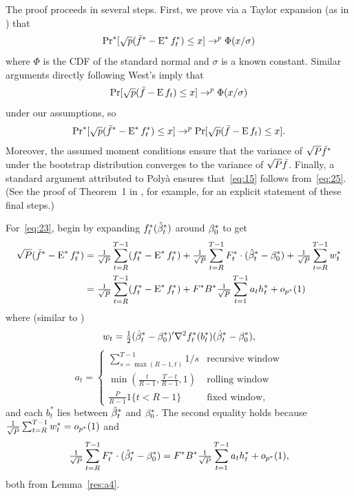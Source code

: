 \documentclass[12pt,fleqn]{article}
\begin{document}
The proof proceeds in several steps. First, we prove via a Taylor
expansion (as in \citealp{Wes:96}) that
\begin{equation}\label{eq:23}
  \operatorname{Pr}^*[\sqrt{p} (\bar f^* - \operatorname{E}^* f_t^*) \leq x] \to^p \Phi(x / \sigma)
\end{equation}
where $\Phi$ is the CDF of the standard normal and $\sigma$ is a known
constant. Similar arguments directly following West's imply that
\begin{equation}\label{eq:24}
  \operatorname{Pr}[\sqrt{p} (\bar f - \operatorname{E} f_t) \leq x] \to^p \Phi(x / \sigma)
\end{equation}
under our assumptions, so
\begin{equation}\label{eq:25}
  \operatorname{Pr}^*[\sqrt{p} (\bar f^* - \operatorname{E}^* f_t^*) \leq x] \to^p
  \operatorname{Pr}[\sqrt{p} (\bar f - \operatorname{E} f_t) \leq x].
\end{equation}
Moreover, the assumed moment conditions ensure that the variance of
$\sqrt{P} \bar f^*$ under the bootstrap distribution converges to the
variance of $\sqrt{P} \bar f$. Finally, a standard argument attributed
to Poly{\`a} ensures that~\eqref{eq:15} follows
from~\eqref{eq:25}. (See the proof of Theorem~1 in \citealp{Cal:14},
for example, for an explicit statement of these final steps.)

For~\eqref{eq:23}, begin by expanding $f_t^{*}(\hat \beta_t^*)$ around
$\beta_0^*$ to get
  \begin{align*}
    \sqrt{P} (\bar f^* - \operatorname{E}^* f_t^*)
    &= \tfrac{1}{\sqrt{P}} \sum_{t=R}^{T-1} (f_t^{*} - \operatorname{E}^* f_t^*)
     + \tfrac{1}{\sqrt{P}} \sum_{t=R}^{T-1} F_t^* \cdot (\hat \beta_t^* - \beta_0^*)
     + \tfrac{1}{\sqrt{P}} \sum_{t=R}^{T-1} w_t^* \\
    &= \tfrac{1}{\sqrt{P}} \sum_{t=R}^{T-1} (f_t^{*} - \operatorname{E}^* f_t^*)
     + F^* B^* \tfrac{1}{\sqrt{P}} \sum_{t=1}^{T-1} a_t h_t^* + o_{p^*}(1)
  \end{align*}
  where (similar to \citealp{Wes:96})
  \begin{equation*}
    w_{t} = \tfrac12 (\hat \beta_t^* - \beta_0^*)' \nabla^2 f_{t}^*(b_{t}^*) (\hat \beta_t^* - \beta_0^*),
  \end{equation*}
  \begin{equation}\label{eq:1}
    a_t =
    \begin{cases}
      \sum_{s=\max(R-1, t)}^{T-1} 1/s & \text{recursive window} \\
      \min(\tfrac{t}{R-1}, \tfrac{T - t}{R-1}, 1) & \text{rolling window} \\
      \tfrac{P}{R-1} 1\{t < R-1\} &  \text{fixed window},
    \end{cases}
  \end{equation}
  and each $b_{t}^*$ lies between $\hat \beta_t^*$ and $\beta_0^*$. The second equality holds because
  $\tfrac{1}{\sqrt{P}} \sum_{t=R}^{T-1} w_t^* = o_{p^*}(1)$ and
  \begin{equation*}
    \tfrac{1}{\sqrt{P}} \sum_{t=R}^{T-1} F_t^* \cdot (\hat \beta_t^* - \beta_0^*)
    = F^* B^* \tfrac{1}{\sqrt{P}} \sum_{t=1}^{T-1} a_t h_t^* + o_{p^*}(1),
  \end{equation*}
  both from Lemma~\ref{res:a4}.
\end{document}
